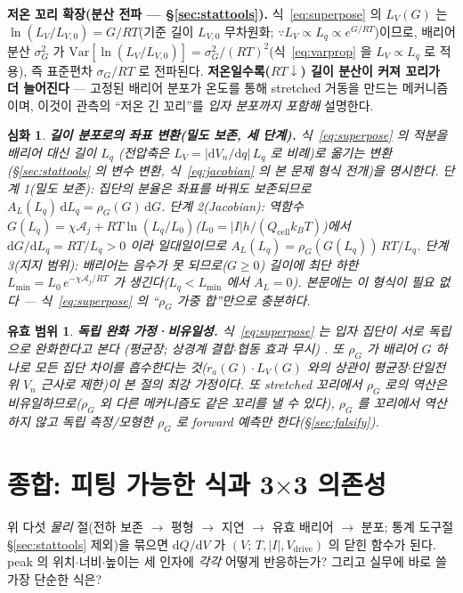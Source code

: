 \documentclass[11pt,a4paper]{article}
\newtheorem*{boundbox}{유효 범위}
\newtheorem*{rigorbox}{심화}
\newcommand{\dd}{\mathrm{d}}
\newcommand{\drive}{\mathrm{drive}}
\newcommand{\cell}{\mathrm{cell}}
\begin{document}
\textbf{저온 꼬리 확장(분산 전파 — \S\ref{sec:stattools}).} 식~\eqref{eq:superpose} 의 $L_V(G)$ 는 $\ln(L_V/L_{V,0})=G/RT$(기준 길이 $L_{V,0}$ 무차원화;
$\because L_V\propto L_q\propto e^{G/RT}$)이므로, 배리어 분산 $\sigma_G^2$ 가 $\mathrm{Var}[\ln(L_V/L_{V,0})]=\sigma_G^2/(RT)^2$(식~\eqref{eq:varprop} 을 $L_V\propto L_q$ 로 적용), 즉
표준편차 $\sigma_G/RT$ 로 전파된다. \textbf{저온일수록($RT\downarrow$) 길이 분산이 커져 꼬리가 더 늘어진다} — 고정된
배리어 분포가 온도를 통해 stretched 거동을 만드는 메커니즘이며, 이것이 관측의 ``저온 긴 꼬리''를 \emph{입자
분포까지 포함해} 설명한다.

\begin{rigorbox}
\textbf{길이 분포로의 좌표 변환(밀도 보존, 세 단계).} 식~\eqref{eq:superpose} 의 적분을 배리어 대신 길이 $L_q$
(전압축은 $L_V=|\dd V_n/\dd q|\,L_q$ 로 비례)로 옮기는 변환(\S\ref{sec:stattools} 의 변수 변환, 식~\eqref{eq:jacobian} 의 본 문제 형식 전개)을 명시한다. \emph{단계 1(밀도 보존)}: 집단의 분율은 좌표를 바꿔도 보존되므로 $A_L(L_q)\,\dd L_q=\rho_G(G)\,\dd G$.
\emph{단계 2(Jacobian)}: 역함수 $G(L_q)=\chi\mathcal A_j+RT\ln(L_q/L_0)$($L_0=|I|h/(Q_\cell k_BT)$)에서
$\dd G/\dd L_q=RT/L_q>0$ 이라 일대일이므로 $A_L(L_q)=\rho_G(G(L_q))\,RT/L_q$. \emph{단계 3(지지 범위)}: 배리어는
음수가 못 되므로($G\ge0$) 길이에 최단 하한 $L_{\min}=L_0\,e^{-\chi\mathcal A_j/RT}$ 가 생긴다($L_q<L_{\min}$ 에서
$A_L=0$). 본문에는 이 형식이 필요 없다 — 식~\eqref{eq:superpose} 의 ``$\rho_G$ 가중 합''만으로 충분하다.
\end{rigorbox}
\begin{boundbox}
\textbf{독립 완화 가정·비유일성.} 식~\eqref{eq:superpose} 는 입자 집단이 \emph{서로 독립}으로 완화한다고 본다
(평균장; 상경계 결합$\cdot$협동 효과 무시) \cite{funabiki1999}. 또 $\rho_G$ 가 배리어 $G$ \emph{하나}로 모든 집단
차이를 흡수한다는 것($r_a(G)\cdot L_V(G)$ 와의 상관이 평균장$\cdot$단일전위 $V_n$ 근사로 제한)이 본 절의 최강 가정이다.
또 stretched 꼬리에서 $\rho_G$ 로의 역산은
\emph{비유일}하므로($\rho_G$ 외 다른 메커니즘도 같은 꼬리를 낼 수 있다), $\rho_G$ 를 꼬리에서 역산하지 않고
독립 측정/모형한 $\rho_G$ 로 \emph{forward 예측}만 한다(\S\ref{sec:falsify}).
\end{boundbox}

\section{종합: 피팅 가능한 식과 3$\times$3 의존성}\label{sec:synth}
위 다섯 \emph{물리} 절(전하 보존 $\to$ 평형 $\to$ 지연 $\to$ 유효 배리어 $\to$ 분포; 통계 도구절
\S\ref{sec:stattools} 제외)을 묶으면 $\dd Q/\dd V$ 가 $(V;\,T,|I|,V_\drive)$ 의 닫힌 함수가 된다. peak 의
위치$\cdot$너비$\cdot$높이는 세 인자에 \emph{각각} 어떻게 반응하는가? 그리고 실무에 바로 쓸 가장 단순한 식은?
\end{document}
